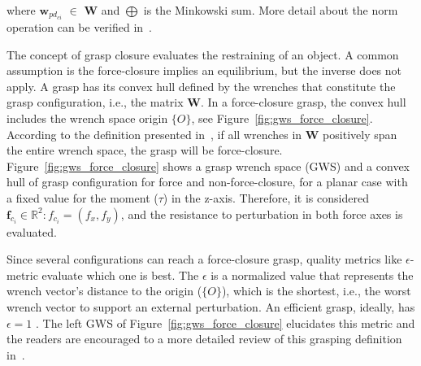 \noindent
where $\mathbf{w}_{pd_{ci}}$ $\in$ $\mathbf{W}$ and $\bigoplus$ is the Minkowski sum. More detail about the norm operation can be verified in~\cite{Ferrari}.


The concept of grasp closure evaluates the restraining of an object. A common assumption is the force-closure implies an equilibrium, but the inverse does not apply. A grasp has its convex hull defined by the wrenches that constitute the grasp configuration, i.e., the matrix $\mathbf{W}$. In a force-closure grasp, the convex hull includes the wrench space origin $\{O\}$, see Figure~\ref{fig:gws_force_closure}. According to the definition presented in~\cite{salisbury1983kinematic}, if all wrenches in $\mathbf{W}$ positively span the entire wrench space, the grasp will be force-closure. Figure~\ref{fig:gws_force_closure} shows a  grasp wrench space (GWS) and a convex hull of grasp configuration for force and non-force-closure, for a planar case with a fixed value for the moment ($\tau$) in the z-axis. Therefore, it is considered $\mathbf{f}_{c_i} \in  \mathbb{R}^2:  {f}_{c_i}  = (f_{x} , f_{y})$, and  the resistance to perturbation in both force axes is evaluated. 

\begin{figure}[h!]
\end{figure}

Since several configurations can reach a force-closure grasp, quality metrics like $\epsilon$-metric evaluate which one is best. The $\epsilon$ is a normalized value that represents the wrench vector's distance to the origin ($\{O\}$), which is the shortest, i.e., the worst wrench vector to support an external perturbation. An efficient grasp, ideally, has $\epsilon=1$ . The left GWS of Figure~\ref{fig:gws_force_closure} elucidates this metric and the readers are encouraged to a more detailed review of this grasping definition in~\cite{Ferrari}.


